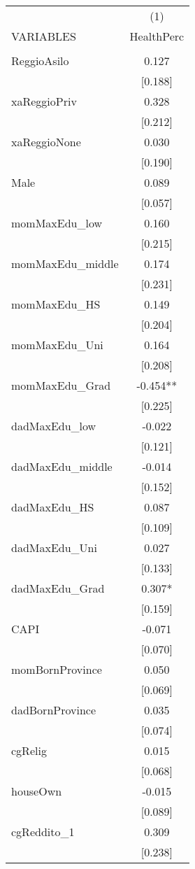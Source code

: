 \documentclass[]{article}
\begin{document}
\begin{tabular}{lc} \hline
 & (1) \\
VARIABLES & HealthPerc \\ \hline
 &  \\
ReggioAsilo & 0.127 \\
 & [0.188] \\
xaReggioPriv & 0.328 \\
 & [0.212] \\
xaReggioNone & 0.030 \\
 & [0.190] \\
Male & 0.089 \\
 & [0.057] \\
momMaxEdu\_low & 0.160 \\
 & [0.215] \\
momMaxEdu\_middle & 0.174 \\
 & [0.231] \\
momMaxEdu\_HS & 0.149 \\
 & [0.204] \\
momMaxEdu\_Uni & 0.164 \\
 & [0.208] \\
momMaxEdu\_Grad & -0.454** \\
 & [0.225] \\
dadMaxEdu\_low & -0.022 \\
 & [0.121] \\
dadMaxEdu\_middle & -0.014 \\
 & [0.152] \\
dadMaxEdu\_HS & 0.087 \\
 & [0.109] \\
dadMaxEdu\_Uni & 0.027 \\
 & [0.133] \\
dadMaxEdu\_Grad & 0.307* \\
 & [0.159] \\
CAPI & -0.071 \\
 & [0.070] \\
momBornProvince & 0.050 \\
 & [0.069] \\
dadBornProvince & 0.035 \\
 & [0.074] \\
cgRelig & 0.015 \\
 & [0.068] \\
houseOwn & -0.015 \\
 & [0.089] \\
cgReddito\_1 & 0.309 \\
 & [0.238] \\

\end{tabular}
\end{document}
